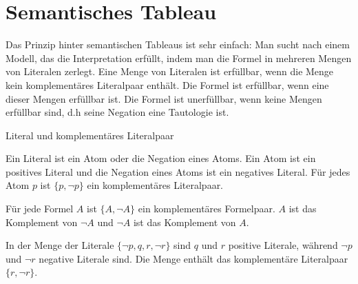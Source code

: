 \section{Semantisches Tableau}
%
% 

Das Prinzip hinter semantischen Tableaus ist sehr einfach: Man sucht nach einem Modell, das die Interpretation erfüllt, indem man die Formel in mehreren Mengen von Literalen zerlegt. Eine Menge von Literalen ist erfüllbar, wenn die Menge kein komplementäres Literalpaar enthält. Die Formel ist erfüllbar, wenn eine dieser Mengen erfüllbar ist. Die Formel ist unerfüllbar, wenn keine Mengen erfüllbar sind, d.h seine Negation eine Tautologie ist.

\begin{defi} \label{Definition 2.57} Literal und komplementäres Literalpaar\cite{Ben-Ari}\end{defi} 
Ein Literal ist ein Atom oder die Negation eines Atoms. Ein Atom ist ein positives Literal und die Negation eines Atoms ist ein negatives Literal. Für jedes Atom $p$ ist $\{p, \neg p\}$ ein komplementäres Literalpaar.

Für jede Formel $A$ ist $\{A, \neg A\}$ ein komplementäres Formelpaar. $A$ ist das Komplement von $\neg A$ und $\neg A$ ist das Komplement von $A$.

\begin{ex} \label{Beispiel 2.58} \end{ex} In der Menge der Literale $ \{ \neg p, q, r, \neg r \} $ sind $q$ und $r$ positive Literale, während $\neg p$ und $\neg r$ negative Literale sind. Die Menge enthält das komplementäre Literalpaar $ \{ r, \neg r \}$.
 
 
